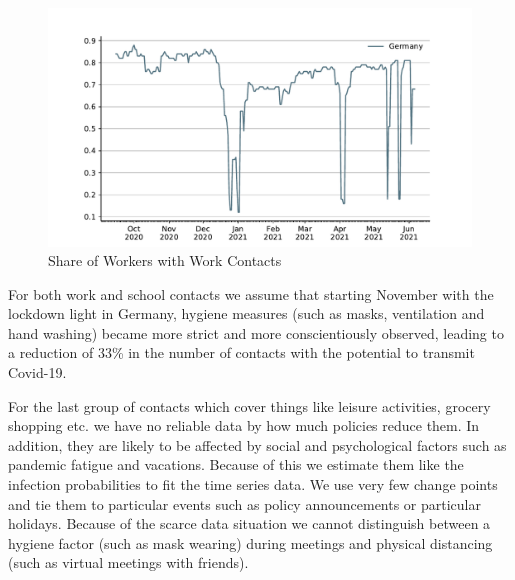 \begin{figure}[ht]
    \centering
    \includegraphics[width=\textwidth]{../figures/results/figures/data/work_multiplier_since_sep}
    \caption{Share of Workers with Work Contacts}
    \label{fig:work_multiplier}
\end{figure}

For both work and school contacts we assume that starting November with the lockdown
light in Germany, hygiene measures (such as masks, ventilation and hand washing) became
more strict and more conscientiously observed, leading to a reduction of 33\% in the number of contacts with the potential to transmit Covid-19.

For the last group of contacts which cover things like leisure activities, grocery
shopping etc. we have no reliable data by how much policies reduce them. In addition,
they are likely to be affected by social and psychological factors such as pandemic
fatigue and vacations. Because of this we estimate them like the infection probabilities
to fit the time series data. We use very few change points and tie them to particular
events such as policy announcements or particular holidays. Because of the scarce data situation we cannot distinguish between a hygiene factor (such as mask wearing) during meetings and physical distancing (such as virtual meetings with friends).

